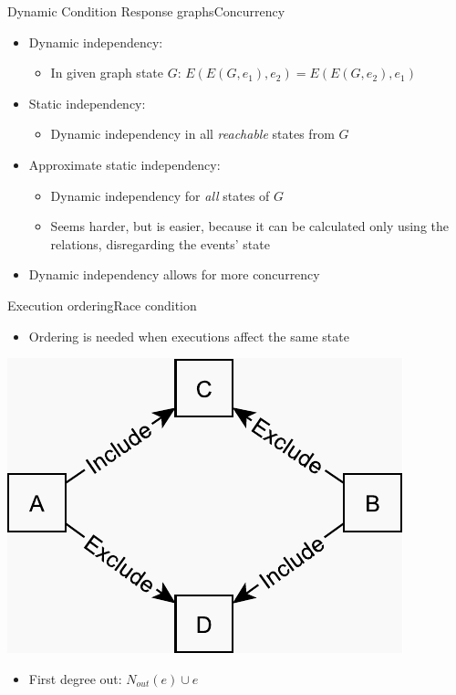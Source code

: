 \documentclass{beamer}
\begin{document}
\begin{frame}{Dynamic Condition Response graphs}{Concurrency}
	\begin{itemize}
		\item Dynamic independency:
		\begin{itemize}
			\item In given graph state $G$: $E(E(G, e_1),e_2)=E(E(G, e_2),e_1)$
		\end{itemize}

		\vfill

		\item Static independency:
		\begin{itemize}
			\item Dynamic independency in all \textit{reachable} states from $G$
		\end{itemize}

		\vfill

		\item Approximate static independency:
		\begin{itemize}
		 	\item Dynamic independency for \textit{all} states of $G$
		 	\item Seems harder, but is easier, because it can be calculated only using the relations, disregarding the events' state
		\end{itemize}

		\vfill

		\item Dynamic independency allows for more concurrency
  \end{itemize}
\end{frame}

\begin{frame}{Execution ordering}{Race condition}%
	\begin{itemize}
		\item Ordering is needed when executions affect the same state
	\end{itemize}
	\vspace{\fill}
	\centering
    \includegraphics[scale=0.5]{figures/race-condition.pdf}
    \vspace{\fill}
    \begin{itemize}
    	\item First degree out: $N_{out}(e) \cup e$
    \end{itemize}
\end{frame}
\end{document}
